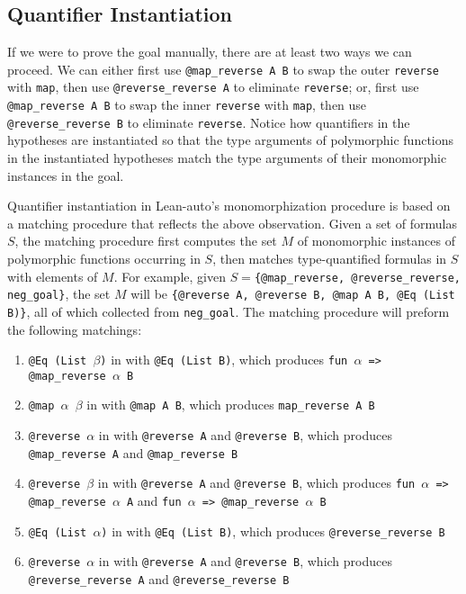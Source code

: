 \subsection{Quantifier Instantiation} \label{exinst}

If we were to prove the goal manually, there are at least two ways we can proceed. We can
either first use \texttt{@map\_reverse A B} to swap the outer \texttt{reverse} with \texttt{map}, then
use \texttt{@reverse\_reverse A} to eliminate \texttt{reverse}; or, first use
\texttt{@map\_reverse A B} to swap the inner \texttt{reverse} with \texttt{map}, then
use \texttt{@reverse\_reverse B} to eliminate \texttt{reverse}. Notice how quantifiers
in the hypotheses are instantiated so that the type arguments of polymorphic functions
in the instantiated hypotheses match the type arguments of their monomorphic instances in the goal.

\noindent Quantifier instantiation in Lean-auto's monomorphization procedure is based
on a matching procedure that reflects the above observation. Given a set of formulas $S$,
the matching procedure first computes the set $M$ of monomorphic instances of polymorphic functions occurring
in $S$, then matches type-quantified formulas in $S$ with elements of $M$. For example,
given $S=$\texttt{\{@map\_reverse, @reverse\_reverse, neg\_goal\}}, the set $M$ will be
\texttt{\{@reverse A, @reverse B, @map A B, @Eq (List B)\}}, all of which collected from \texttt{neg\_goal}.
The matching procedure will preform the following matchings:

\begin{enumerate}
  \item \texttt{@Eq (List $\beta$)} in \usebox{\vmaprev} with \texttt{@Eq (List B)},
    which produces \texttt{fun $\alpha$ => @map\_reverse $\alpha$ B}
  \item \texttt{@map $\alpha$ $\beta$} in \usebox{\vmaprev} with \texttt{@map A B},
    which produces \texttt{map\_reverse A B}
  \item \texttt{@reverse $\alpha$} in \usebox{\vmaprev} with \texttt{@reverse A} and \texttt{@reverse B},
    which produces \texttt{@map\_reverse A} and \texttt{@map\_reverse B}
  \item \texttt{@reverse $\beta$} in \usebox{\vmaprev} with \texttt{@reverse A} and \texttt{@reverse B},
    which produces \texttt{fun $\alpha$ => @map\_reverse $\alpha$ A} and \texttt{fun $\alpha$ => @map\_reverse $\alpha$ B}
  \item \texttt{@Eq (List $\alpha$)} in \usebox{\vrevrev} with \texttt{@Eq (List B)},
    which produces \texttt{@reverse\_reverse B}
  \item \texttt{@reverse $\alpha$} in \usebox{\vrevrev} with \texttt{@reverse A} and \texttt{@reverse B},
    which produces \texttt{@reverse\_reverse A} and \texttt{@reverse\_reverse B}
\end{enumerate}

